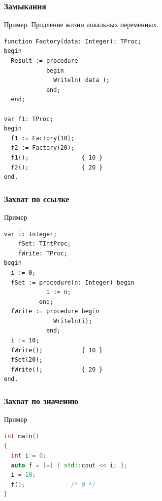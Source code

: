 \documentclass[roman,12pt]{beamer}
\begin{document}
\begin{frame}[fragile]
  \frametitle{Замыкания}
  \begin{block}{Пример. Продление жизни локальных переменных.}
\begin{lstlisting}
function Factory(data: Integer): TProc;
begin
  Result := procedure
            begin
              Writeln( data );
            end;
  end;
    
var f1: TProc;
begin
  f1 := Factory(10);
  f2 := Factory(20);
  f1();               { 10 }
  f2();               { 20 }
end.
\end{lstlisting}    
  \end{block} 
\end{frame}

\begin{frame}[fragile]
  \frametitle{Захват по ссылке}
  \begin{block}{Пример}
\begin{lstlisting}
var i: Integer;
    fSet: TIntProc;
    fWrite: TProc;
begin
  i := 0;
  fSet := procedure(n: Integer) begin
            i := n;
          end;
  fWrite := procedure begin
              Writeln(i);
            end;
  i := 10;
  fWrite();           { 10 }
  fSet(20);    
  fWrite();           { 20 }
end.
\end{lstlisting}
 \end{block} 
\end{frame}

\begin{frame}[fragile]
  \frametitle{Захват по значению}
 \begin{block}{Пример}
    \begin{lstlisting}[language=c++]
int main()
{
  int i = 0;
  auto f = [=] { std::cout << i; };
  i = 10;
  f();             /* 0 */
}   
    \end{lstlisting}
  \end{block} 
\end{frame}
  
\end{document}
